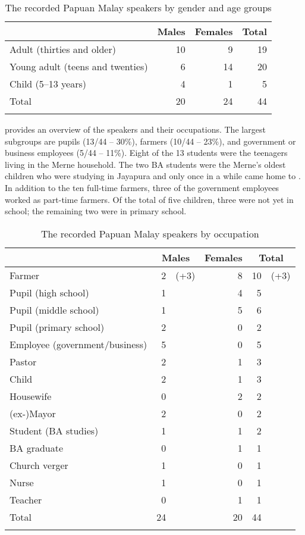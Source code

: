 {\begin{table}
\caption{The recorded Papuan Malay speakers by gender and age groups}\label{Table_1.19}
\begin{tabular}{lrrr}
\lsptoprule
 \multicolumn{1}{c}{Age groups} & Males & Females &  Total\\
\midrule

Adult (thirties and older) &  10 &  9 &  19\\
Young adult (teens and twenties) &  6 &  14 &  20\\
Child (5--13 years) &  4 &  1 &  5\\
\midrule
Total &  20 &  24 &  44\\
\lspbottomrule
\end{tabular}
\end{table}

 provides an overview of the speakers and their occupations. The largest subgroups are pupils (13/44 – 30\%), farmers (10/44 – 23\%), and government or business employees (5/44 – 11\%). Eight of the 13 students were the teenagers living in the Merne household. The two BA students were the Merne’s oldest children who were studying in Jayapura and only once in a while came home to . In addition to the ten full-time farmers, three of the government employees worked as part-time farmers. Of the total of five children, three were not yet in school; the remaining two were in primary school.

\begin{table}
\caption{The recorded Papuan Malay speakers by occupation}\label{Table_1.20}


\begin{tabular}{lr@{ }lrr@{ }l}
\lsptoprule
 \multicolumn{1}{c}{Occupation} & \multicolumn{2}{c}{Males}   & \multicolumn{1}{c}{Females} &  \multicolumn{2}{c}{Total} \\


\midrule
Farmer &  2 & (+3) &  8 &  10 & (+3)\\
Pupil (high school) &  1 & &  4 &  5& \\
Pupil (middle school) &  1&  &  5 &  6& \\
Pupil (primary school) &  2&  &  0 &  2& \\
Employee (government/business) &  5 & &   0 &  5& \\
Pastor &  2 &  &  1 &  3& \\
Child &  2 & &  1 &  3& \\
Housewife &  0 & &  2 &  2& \\
(ex-)Mayor &  2 & &   0 &  2& \\
Student (BA studies) &  1 & &  1 &  2& \\
BA graduate &  0 & & 1 &  1& \\
Church verger &  1 & &  0 &  1& \\
Nurse &  1 & &  0 &  1& \\
Teacher &  0 & &  1 &  1& \\
\midrule
Total &  24 & &  20 &  44& \\
\lspbottomrule
\end{tabular}
\end{table}
}
